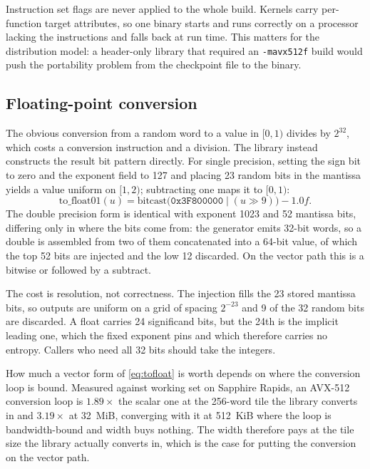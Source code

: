 \documentclass[acmsmall,screen,review]{acmart}
\theoremstyle{acmdefinition}
\newcommand{\code}[1]{\texttt{#1}}
\begin{document}
Instruction set flags are never applied to the whole build. Kernels carry
per-function target attributes, so one binary starts and runs correctly on a
processor lacking the instructions and falls back at run time. This matters for
the distribution model: a header-only library that required an
\code{-mavx512f} build would push the portability problem from the checkpoint
file to the binary.

\subsection{Floating-point conversion}\label{sec:float}

The obvious conversion from a random word to a value in $[0,1)$ divides by
$2^{32}$, which costs a conversion instruction and a division. The library
instead constructs the result bit pattern directly. For single precision,
setting the sign bit to zero and the exponent field to 127 and placing 23
random bits in the mantissa yields a value uniform on $[1, 2)$; subtracting one
maps it to $[0, 1)$:
\begin{equation}\label{eq:tofloat}
  \mathrm{to\_float01}(u) =
    \mathrm{bitcast}\bigl(\mathtt{0x3F800000} \mathbin{|} (u \gg 9)\bigr) - 1.0f.
\end{equation}
The double precision form is identical with exponent 1023 and 52 mantissa
bits, differing only in where the bits come from: the generator emits 32-bit
words, so a double is assembled from two of them concatenated into a 64-bit
value, of which the top 52 bits are injected and the low 12 discarded.
On the vector path this is a bitwise or followed by a subtract.

The cost is resolution, not correctness. The injection fills the 23
stored mantissa bits, so outputs are uniform on a grid of spacing $2^{-23}$ and
9 of the 32 random bits are discarded. A float carries 24 significand bits, but
the 24th is the implicit leading one, which the fixed exponent pins and which
therefore carries no entropy. Callers who need all 32 bits should take the
integers.

How much a vector form of \cref{eq:tofloat} is worth depends on where the
conversion loop is bound. Measured against working set on Sapphire Rapids, an
AVX-512 conversion loop is $1.89\times$ the scalar one at the 256-word tile the
library converts in and $3.19\times$ at 32~MiB, converging with it at 512~KiB
where the loop is bandwidth-bound and width buys nothing. The width therefore pays at the tile size the library actually converts in,
which is the case for putting the conversion on the vector path.
\end{document}
